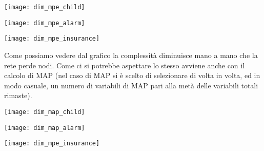 \begin{minipage}{\linewidth}
	\centering
	\texttt{[image: dim\_mpe\_child]}
	\label{dim_mpe_child} 
\end{minipage}

\begin{minipage}{\linewidth}
	\centering
	\texttt{[image: dim\_mpe\_alarm]}
	\label{dim_mpe_alarm} 
\end{minipage}
 
\begin{minipage}{\linewidth}
	\centering
	\texttt{[image: dim\_mpe\_insurance]}
	\label{dim_mpe_insurance} 
\end{minipage}

Come possiamo vedere dal grafico la complessità diminuisce mano a mano che la rete perde nodi. Come ci si potrebbe aspettare lo stesso avviene anche con il calcolo di MAP (nel caso di MAP si è scelto di selezionare di volta in volta, ed in modo casuale, un numero di variabili di MAP pari alla metà delle variabili totali rimaste). 

\begin{minipage}{\linewidth}
	\centering
	\texttt{[image: dim\_map\_child]}
	\label{dim_map_child} 
\end{minipage}

\begin{minipage}{\linewidth}
	\centering
	\texttt{[image: dim\_map\_alarm]}
	\label{dim_map_alarm} 
\end{minipage}
 
\begin{minipage}{\linewidth}
	\centering
	\texttt{[image: dim\_mpe\_insurance]}
	\label{dim_map_insurance} 
\end{minipage}


